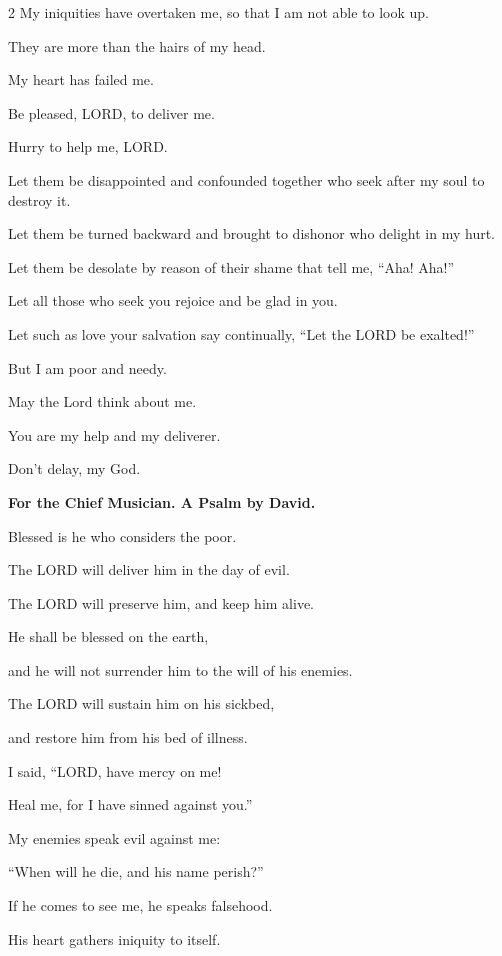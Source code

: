 \begin{multicols}{2}
	My iniquities have overtaken me, so that I am not able to look up.
	
	They are more than the hairs of my head.
	
	My heart has failed me.
	
	
	\myverse{}Be pleased, LORD, to deliver me.
	
	Hurry to help me, LORD.
	
	
	\myverse{}Let them be disappointed and confounded together who seek after
	my soul to destroy it.
	
	Let them be turned backward and brought to dishonor who delight in my hurt.
	
	
	\myverse{}Let them be desolate by reason of their shame that tell me,
	“Aha! Aha!”
	
	
	\myverse{}Let all those who seek you rejoice and be glad in you.
	
	Let such as love your salvation say continually, “Let the LORD be exalted!”
	
	
	\myverse{}But I am poor and needy.
	
	May the Lord think about me.
	
	You are my help and my deliverer.
	
	Don’t delay, my God.
	
	
	\mychapter{}\textbf{For the Chief Musician. A Psalm by David.}
	
	\quad \myverse*{}Blessed is he who considers the poor.
	
	The LORD will deliver him in the day of evil.
	
	
	\myverse{}The LORD will preserve him, and keep him alive.
	
	He shall be blessed on the earth,
	
	and he will not surrender him to the will of his enemies.
	
	
	\myverse{}The LORD will sustain him on his sickbed,
	
	and restore him from his bed of illness.
	
	
	\myverse{}I said, “LORD, have mercy on me!
	
	Heal me, for I have sinned against you.”
	
	
	\myverse{}My enemies speak evil against me:
	
	“When will he die, and his name perish?”
	
	
	\myverse{}If he comes to see me, he speaks falsehood.
	
	His heart gathers iniquity to itself.
	

\end{multicols}
